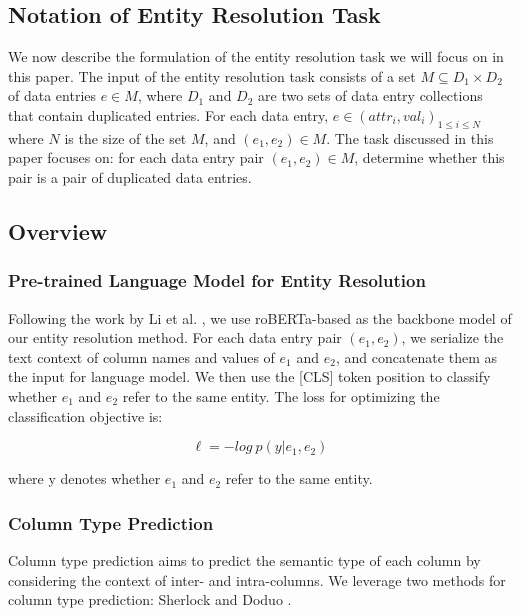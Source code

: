 \subsection{Notation of Entity Resolution Task}
We now describe the formulation of the entity resolution task we will focus on in this paper. The input of the entity resolution task consists of a set $M \subseteq D_1 \times D_2$ of data entries $e \in M$, where $D_1$ and $D_2$ are two sets of data entry collections that contain duplicated entries. 
For each data entry, $e \in {(attr_i, val_i)}_{1 \leq i \leq N}$ where $N$ is the size of the set $M$, and $(e_1, e_2) \in M$. The task discussed in this paper focuses on: for each data entry pair $(e_1, e_2) \in M$, determine whether this pair is a pair of duplicated data entries.

\subsection{Overview}


\subsubsection{Pre-trained Language Model for Entity Resolution}
Following the work by Li et al. \cite{li_deep_2020}, we use roBERTa-based as the backbone model of our entity resolution method. For each data entry pair $(e_1, e_2)$, we serialize the text context of column names and values of $e_1$ and $e_2$, and concatenate them as the input for language model. We then use the [CLS] token position to classify whether $e_1$ and $e_2$ refer to the same entity. 
The loss for optimizing the classification objective is:

\begin{equation}
    \ell = - log\ p(y | e_1, e_2)
\end{equation}

where y denotes whether $e_1$ and $e_2$ refer to the same entity. 



\subsubsection{Column Type Prediction}
Column type prediction aims to predict the semantic type of each column by considering the context of inter- and intra-columns. We leverage two methods for column type prediction: Sherlock \cite{hulsebos_sherlock_2019} and Doduo \cite{suhara_annotating_2022}.

